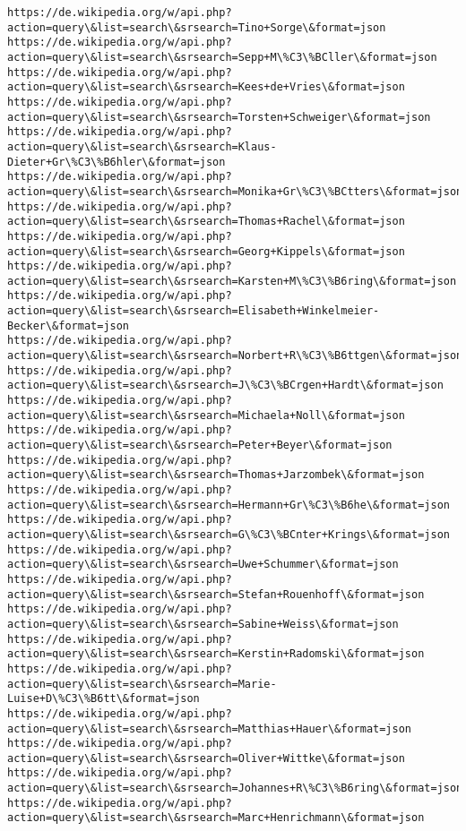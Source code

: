 \documentclass[11pt]{article}
\begin{document}
\begin{Verbatim}[commandchars=\\\{\}]
https://de.wikipedia.org/w/api.php?action=query\&list=search\&srsearch=Tino+Sorge\&format=json
https://de.wikipedia.org/w/api.php?action=query\&list=search\&srsearch=Sepp+M\%C3\%BCller\&format=json
https://de.wikipedia.org/w/api.php?action=query\&list=search\&srsearch=Kees+de+Vries\&format=json
https://de.wikipedia.org/w/api.php?action=query\&list=search\&srsearch=Torsten+Schweiger\&format=json
https://de.wikipedia.org/w/api.php?action=query\&list=search\&srsearch=Klaus-Dieter+Gr\%C3\%B6hler\&format=json
https://de.wikipedia.org/w/api.php?action=query\&list=search\&srsearch=Monika+Gr\%C3\%BCtters\&format=json
https://de.wikipedia.org/w/api.php?action=query\&list=search\&srsearch=Thomas+Rachel\&format=json
https://de.wikipedia.org/w/api.php?action=query\&list=search\&srsearch=Georg+Kippels\&format=json
https://de.wikipedia.org/w/api.php?action=query\&list=search\&srsearch=Karsten+M\%C3\%B6ring\&format=json
https://de.wikipedia.org/w/api.php?action=query\&list=search\&srsearch=Elisabeth+Winkelmeier-Becker\&format=json
https://de.wikipedia.org/w/api.php?action=query\&list=search\&srsearch=Norbert+R\%C3\%B6ttgen\&format=json
https://de.wikipedia.org/w/api.php?action=query\&list=search\&srsearch=J\%C3\%BCrgen+Hardt\&format=json
https://de.wikipedia.org/w/api.php?action=query\&list=search\&srsearch=Michaela+Noll\&format=json
https://de.wikipedia.org/w/api.php?action=query\&list=search\&srsearch=Peter+Beyer\&format=json
https://de.wikipedia.org/w/api.php?action=query\&list=search\&srsearch=Thomas+Jarzombek\&format=json
https://de.wikipedia.org/w/api.php?action=query\&list=search\&srsearch=Hermann+Gr\%C3\%B6he\&format=json
https://de.wikipedia.org/w/api.php?action=query\&list=search\&srsearch=G\%C3\%BCnter+Krings\&format=json
https://de.wikipedia.org/w/api.php?action=query\&list=search\&srsearch=Uwe+Schummer\&format=json
https://de.wikipedia.org/w/api.php?action=query\&list=search\&srsearch=Stefan+Rouenhoff\&format=json
https://de.wikipedia.org/w/api.php?action=query\&list=search\&srsearch=Sabine+Weiss\&format=json
https://de.wikipedia.org/w/api.php?action=query\&list=search\&srsearch=Kerstin+Radomski\&format=json
https://de.wikipedia.org/w/api.php?action=query\&list=search\&srsearch=Marie-Luise+D\%C3\%B6tt\&format=json
https://de.wikipedia.org/w/api.php?action=query\&list=search\&srsearch=Matthias+Hauer\&format=json
https://de.wikipedia.org/w/api.php?action=query\&list=search\&srsearch=Oliver+Wittke\&format=json
https://de.wikipedia.org/w/api.php?action=query\&list=search\&srsearch=Johannes+R\%C3\%B6ring\&format=json
https://de.wikipedia.org/w/api.php?action=query\&list=search\&srsearch=Marc+Henrichmann\&format=json

\end{Verbatim}
\end{document}
